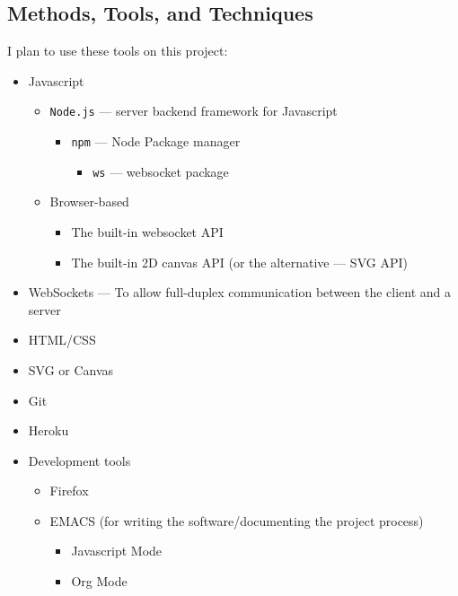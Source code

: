 \documentclass[11pt]{article}
\begin{document}
\subsection{Methods, Tools, and Techniques}
\label{sec:orgfe8e940}
I plan to use these tools on this project:
\begin{itemize}
\item Javascript
\begin{itemize}
\item \texttt{Node.js} --- server backend framework for Javascript
\begin{itemize}
\item \texttt{npm} --- Node Package manager
\begin{itemize}
\item \texttt{ws} --- websocket package
\end{itemize}
\end{itemize}
\item Browser-based
\begin{itemize}
\item The built-in websocket API
\item The built-in 2D canvas API (or the alternative --- SVG API)
\end{itemize}
\end{itemize}
\item WebSockets --- To allow full-duplex communication between the client and a server
\item HTML/CSS
\item SVG or Canvas
\item Git
\item Heroku
\item Development tools
\begin{itemize}
\item Firefox
\item EMACS (for writing the software/documenting the project process)
\begin{itemize}
\item Javascript Mode
\item Org Mode
\end{itemize}
\end{itemize}
\end{itemize}
\end{document}
